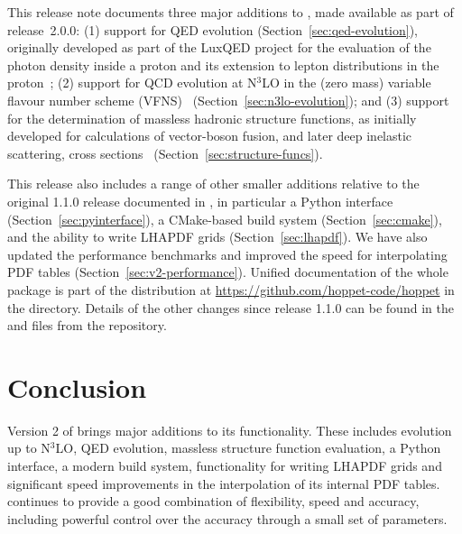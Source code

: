 \documentclass[preprint,1p,a4paper,11pt]{elsarticle}
\begin{document}
This release note documents three major additions to \hoppet, made
available as part of release~2.0.0: (1) support for QED evolution (Section~\ref{sec:qed-evolution}),
originally developed as part of the LuxQED project for the evaluation
of the photon density inside a proton and its extension to lepton
distributions in the
proton~\cite{Manohar:2016nzj,Manohar:2017eqh,Buonocore:2020nai,Buonocore:2021bsf};
%
(2) support for QCD evolution at N$^3$LO in the (zero mass) variable
flavour number scheme (VFNS)~\cite{Buza:1996wv} (Section~\ref{sec:n3lo-evolution});
%
and (3) support for the
determination of massless hadronic structure functions, as initially developed
for calculations of vector-boson fusion, and later deep inelastic scattering, cross
sections~\cite{Cacciari:2015jma,Dreyer:2016oyx,Dreyer:2018qbw,Dreyer:2018rfu,Karlberg:2024hnl}
(Section~\ref{sec:structure-funcs}).

This release also includes a range of other smaller additions relative
to the original 1.1.0 release documented in \cite{Salam:2008qg}, in
particular a Python interface
(Section~\ref{sec:pyinterface}), a CMake-based build system
(Section~\ref{sec:cmake}), and the ability to write LHAPDF grids
(Section~\ref{sec:lhapdf}).
%
We have also updated the performance benchmarks and improved the speed
for interpolating PDF tables (Section~\ref{sec:v2-performance}).
%
Unified documentation of the whole \hoppet package is part of the
distribution at \url{https://github.com/hoppet-code/hoppet} in the
 directory.
%
Details of the other changes since release 1.1.0 can be found in the
 and  files from the
repository.\medskip

\noindent {}



\section{Conclusion}

Version 2 of \hoppet brings major additions to its functionality.
%
These includes evolution up to N$^3$LO, QED evolution, massless
structure function evaluation, a Python interface, a modern build
system, functionality for writing LHAPDF grids and significant speed
improvements in the interpolation of its internal PDF tables.
%
\hoppet continues to provide a good combination of flexibility, speed
and accuracy, including powerful control over the accuracy through a
small set of parameters.
%
\end{document}
